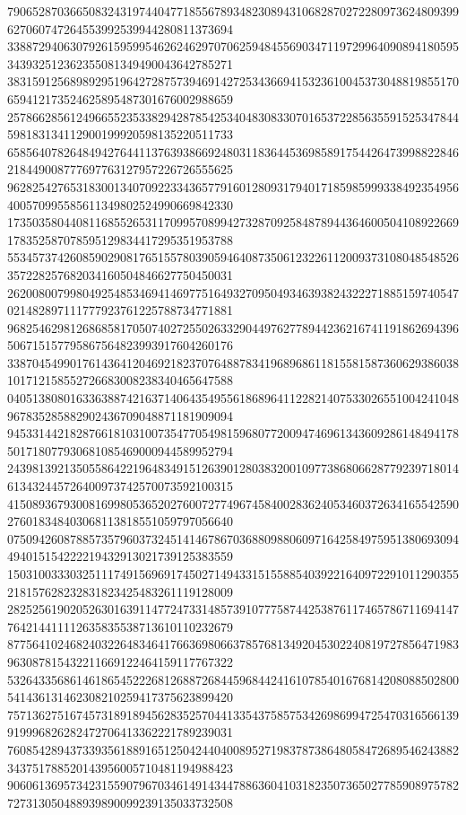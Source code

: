 \begin{DoxyCode}
      790652870366508324319744047718556789348230894310682870272280973624809399627060747264553992539944280811373694
      338872940630792615959954626246297070625948455690347119729964090894180595343932512362355081349490043642785271
      383159125689892951964272875739469142725343669415323610045373048819855170659412173524625895487301676002988659
      257866285612496655235338294287854253404830833070165372285635591525347844598183134112900199920598135220511733
      658564078264849427644113763938669248031183644536985891754426473998822846218449008777697763127957226726555625
      962825427653183001340709223343657791601280931794017185985999338492354956400570995585611349802524990669842330
      173503580440811685526531170995708994273287092584878944364600504108922669178352587078595129834417295351953788
      553457374260859029081765155780390594640873506123226112009373108048548526357228257682034160504846627750450031
      262008007998049254853469414697751649327095049346393824322271885159740547021482897111777923761225788734771881
      968254629812686858170507402725502633290449762778944236216741191862694396506715157795867564823993917604260176
      338704549901761436412046921823707648878341968968611815581587360629386038101712158552726683008238340465647588
      040513808016336388742163714064354955618689641122821407533026551004241048967835285882902436709048871181909094
      945331442182876618103100735477054981596807720094746961343609286148494178501718077930681085469000944589952794
      243981392135055864221964834915126390128038320010977386806628779239718014613432445726400973742570073592100315
      415089367930081699805365202760072774967458400283624053460372634165542590276018348403068113818551059797056640
      075094260878857357960373245141467867036880988060971642584975951380693094494015154222219432913021739125383559
      150310033303251117491569691745027149433151558854039221640972291011290355218157628232831823425483261119128009
      282525619020526301639114772473314857391077758744253876117465786711694147764214411112635835538713610110232679
      877564102468240322648346417663698066378576813492045302240819727856471983963087815432211669122464159117767322
      532643356861461865452226812688726844596844241610785401676814208088502800541436131462308210259417375623899420
      757136275167457318918945628352570441335437585753426986994725470316566139919996826282472706413362221789239031
      760854289437339356188916512504244040089527198378738648058472689546243882343751788520143956005710481194988423
      906061369573423155907967034614914344788636041031823507365027785908975782727313050488939890099239135033732508

\end{DoxyCode}
